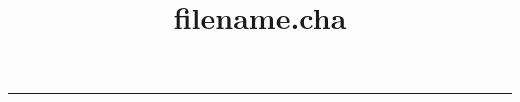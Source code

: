 \documentclass[a4paper,10pt]{article}
\title{filename.cha}
\author{}
\date{}
\begin{document}
\maketitle

\renewcommand{\abstractname}{Conversation details}


\rule{\linewidth}{0.2mm}\\[0.5cm]
\end{document}
